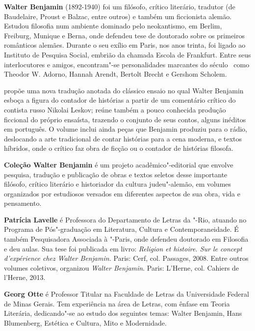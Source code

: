 
\textbf{Walter Benjamin} (1892-1940) foi um filósofo, crítico literário, tradutor (de Baudelaire, Proust e Balzac, entre outros) e também um ficcionista alemão. Estudou filosofia num ambiente dominado pelo neokantismo, em Berlim, Freiburg, Munique e Berna, onde defendeu tese de doutorado sobre os primeiros românticos alemães. Durante o seu exílio em Paris, nos anos trinta, foi ligado ao Instituto de Pesquisa Social, embrião da chamada Escola de Frankfurt. Entre seus interlocutores e amigos, encontram"-se personalidades marcantes do século~ como Theodor W. Adorno, Hannah Arendt, Bertolt Brecht e Gershom Scholem.

\textbf{\titulo} propõe uma nova tradução anotada do clássico ensaio no qual Walter Benjamin esboça a figura do contador de histórias a partir de um comentário crítico do contista russo Nikolai Leskov; reúne também a pouco conhecida produção ficcional do próprio ensaísta, trazendo o conjunto de seus contos, alguns inéditos em português. O volume inclui ainda peças que Benjamin produziu para o rádio, deslocando a arte tradicional de contar histórias para a cena moderna, e textos híbridos, onde o crítico faz obra de ficção ou o contador de histórias filosofa.

\textbf{Coleção Walter Benjamin} é um projeto acadêmico"-editorial que envolve pesquisa, tradução e publicação de obras e textos seletos desse importante filósofo, crítico literário e historiador da cultura judeu"-alemão, em volumes organizados por estudiosos versados em diferentes aspectos de sua obra, vida e pensamento. 

\textbf{Patrícia Lavelle} é Professora do Departamento de Letras da "-Rio, atuando no Programa de Pós"-graduação em Literatura, Cultura e Contemporaneidade. É também Pesquisadora Associada à "-Paris, onde defendeu doutorado em Filosofia e deu aulas. Sua tese foi publicada em livro: \emph{Religion et histoire. Sur le concept d’expérience chez Walter Benjamin.} Paris: Cerf, col. Passages, 2008. Entre outros volumes coletivos, organizou \emph{Walter Benjamin}. Paris: L’Herne, col. Cahiers de l’Herne, 2013. 

\textbf{Georg Otte} é Professor Titular na Faculdade de Letras da Universidade Federal de Minas Gerais. Tem experiência na área de Letras, com ênfase em Teoria Literária, dedicando"-se ao estudo dos seguintes temas: Walter Benjamin, Hans Blumenberg, Estética e Cultura, Mito e Modernidade.


